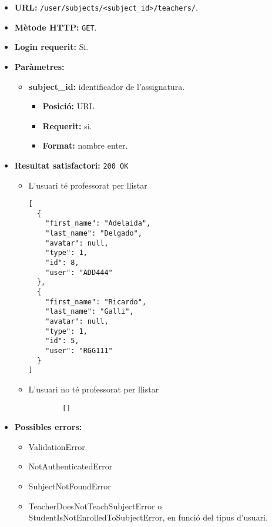 \begin{itemize}
\item \textbf{\ac{URL}: } \texttt{/user/subjects/<subject\_id>/teachers/}.
\item \textbf{Mètode \ac{HTTP}: } \texttt{GET}.
\item \textbf{Login requerit:} Si.
\item \textbf{Paràmetres:}
	\begin{itemize}
		\item \textbf{subject\_id:} identificador de l'assignatura.
		\begin{itemize}
			\item \textbf{Posició:} \ac{URL}
			\item \textbf{Requerit:} si.
			\item \textbf{Format:} nombre enter.
		\end{itemize}
	\end{itemize}
	
\item \textbf{Resultat satisfactori:} \texttt{200 OK}
	\begin{itemize}
		\item L'usuari té professorat per llistar
		\begin{verbatim}
[
  {
    "first_name": "Adelaida",
    "last_name": "Delgado",
    "avatar": null,
    "type": 1,
    "id": 8,
    "user": "ADD444"
  },
  {
    "first_name": "Ricardo",
    "last_name": "Galli",
    "avatar": null,
    "type": 1,
    "id": 5,
    "user": "RGG111"
  }
]
		\end{verbatim}
		\item L'usuari no té professorat per llistar
		\begin{verbatim}
		[]
		\end{verbatim}
	\end{itemize}
\item \textbf{Possibles errors:}
	\begin{itemize}
		\item ValidationError
		\item NotAuthenticatedError
		\item SubjectNotFoundError
		\item TeacherDoesNotTeachSubjectError o StudentIsNotEnrolledToSubjectError, en funció del tipus d'usuari.
	\end{itemize}
\end{itemize}

